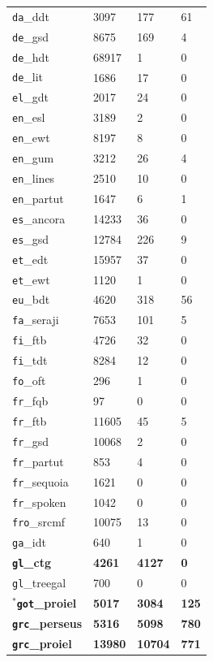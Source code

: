 \begin{table}[H]
{\begin{tabular}{|l|l|l|l|}
\texttt{da}\_ddt & 3097 & 177 & 61\\
\texttt{de}\_gsd & 8675 & 169 & 4\\
\texttt{de}\_hdt & 68917 & 1 & 0\\
\texttt{de}\_lit & 1686 & 17 & 0\\
\texttt{el}\_gdt & 2017 & 24 & 0\\
\texttt{en}\_esl & 3189 & 2 & 0\\
\texttt{en}\_ewt & 8197 & 8 & 0\\
\texttt{en}\_gum & 3212 & 26 & 4\\
\texttt{en}\_lines & 2510 & 10 & 0\\
\texttt{en}\_partut & 1647 & 6 & 1\\
\texttt{es}\_ancora & 14233 & 36 & 0\\
\texttt{es}\_gsd & 12784 & 226 & 9\\
\texttt{et}\_edt & 15957 & 37 & 0\\
\texttt{et}\_ewt & 1120 & 1 & 0\\
\texttt{eu}\_bdt & 4620 & 318 & 56\\
\texttt{fa}\_seraji & 7653 & 101 & 5\\
\texttt{fi}\_ftb & 4726 & 32 & 0\\
\texttt{fi}\_tdt & 8284 & 12 & 0\\
\texttt{fo}\_oft & 296 & 1 & 0\\
\texttt{fr}\_fqb & 97 & 0 & 0\\
\texttt{fr}\_ftb & 11605 & 45 & 5\\
\texttt{fr}\_gsd & 10068 & 2 & 0\\
\texttt{fr}\_partut & 853 & 4 & 0\\
\texttt{fr}\_sequoia & 1621 & 0 & 0 \\
\texttt{fr}\_spoken & 1042 & 0 & 0\\
\texttt{fro}\_srcmf & 10075 & 13 & 0\\
\texttt{ga}\_idt & 640 & 1 & 0\\
\textbf{\texttt{gl}\_ctg} & \textbf{4261} & \textbf{4127} & \textbf{0}\\
\texttt{gl}\_treegal & 700 & 0 & 0\\
\(^{*}\)\textbf{\texttt{got}\_proiel} & \textbf{5017} & \textbf{3084} & \textbf{125}\\
\textbf{\texttt{grc}\_perseus} & \textbf{5316} & \textbf{5098} & \textbf{780}\\
\textbf{\texttt{grc}\_proiel} & \textbf{13980} & \textbf{10704} & \textbf{771}\\

\end{tabular}}
\end{table}
